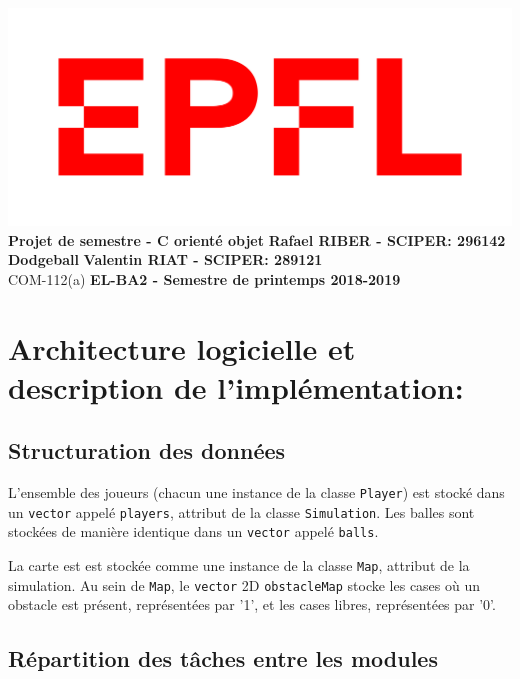 \documentclass[a4paper, 11pt]{article}
\begin{document}
\noindent \includegraphics[scale=0.2]{figures/logo.png}\\
\large\textbf{Projet de semestre - C\raisebox{.5\height}{\scalebox{.5}{++}} orienté objet} \hfill \textbf{Rafael RIBER  - SCIPER: 296142} \\
\large\textbf{Dodgeball} \hfill \hfill \textbf{Valentin RIAT - SCIPER: 289121}\\
\normalsize COM-112(a) \hfill \textbf{EL-BA2 - Semestre de printemps 2018-2019}\\

\section{Architecture logicielle et description de l’implémentation:}

\subsection{Structuration des données}

L'ensemble des joueurs (chacun une instance de la classe \texttt{Player}) est stocké dans un \texttt{vector} appelé \texttt{players}, attribut de la classe \texttt{Simulation}. Les balles sont stockées de manière identique dans un \texttt{vector} appelé \texttt{balls}.

La carte est est stockée comme une instance de la classe \texttt{Map}, attribut de la simulation. Au sein de \texttt{Map}, le \texttt{vector} 2D \texttt{obstacleMap} stocke les cases où un obstacle est présent, représentées par '1', et les cases libres, représentées par '0'.

\subsection{Répartition des tâches entre les modules}
\end{document}
